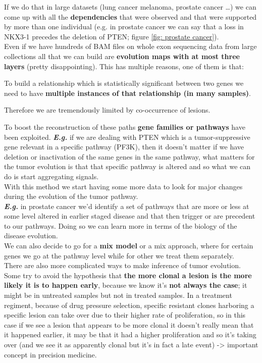 If we do that in
large datasets (lung cancer melanoma, prostate cancer \ldots) we can come up
with all the \textbf{dependencies} that were observed and that were supported by more
than one individual (e.g. in prostate cancer we can say that a loss in NKX3-1
precedes the deletion of PTEN; figure \ref*{fig: prostate cancer}).\\

Even if we have hundreds of BAM files on whole exon sequencing data from large
collections all that we can build are \textbf{evolution maps with at most three layers}
(pretty disappointing). This has multiple reasons, one of them is that:

\begin{center}
  To build a relationship which is statistically significant between two genes
  we need to have\textbf{ multiple instances of that relationship (in many samples)}.  
\end{center}

Therefore we are tremendously limited by co-occurrence of lesions.

To boost the reconstruction of these paths \textbf{gene families or pathways} have been
exploited. \textit{\textbf{E.g.}} if we are dealing with PTEN which is a tumor-suppressive gene relevant in a
specific pathway (PF3K), then it doesn't matter if we have deletion or
inactivation of the same genes in the same pathway, what matters for the tumor
evolution is that that specific pathway is altered and so what we can do is
start aggregating signals.\\

With this method we start having some more data to look for major changes during
the evolution of the tumor pathway.\\

\textit{\textbf{E.g.}} in prostate cancer we'd identify a set of pathways that are more or less at
some level altered in earlier staged disease and that then trigger or are
precedent to our pathways. Doing so we can learn more in terms of the biology of
the disease evolution.\\

We can also decide to go for a \textbf{mix model} or a mix approach, where for certain
genes we go at the pathway level while for other we treat them separately.\\

There are also more complicated ways to make inference of tumor evolution. Some
try to avoid the hypothesis that \textbf{the more clonal a lesion is the more likely it
is to happen early}, because we know it's \textbf{not always the case}; it might be in
untreated samples but not in treated samples. In a treatment regiment, because
of drug pressure selection, specific resistant clones harboring a specific
lesion can take over due to their higher rate of proliferation, so in this case
if we see a lesion that appears to be more clonal it doesn't really mean that it
happened earlier, it may be that it had a higher proliferation and so it's
taking over (and we see it as apparently clonal but it's in fact a late event)
-\textgreater{} important concept in precision medicine.

